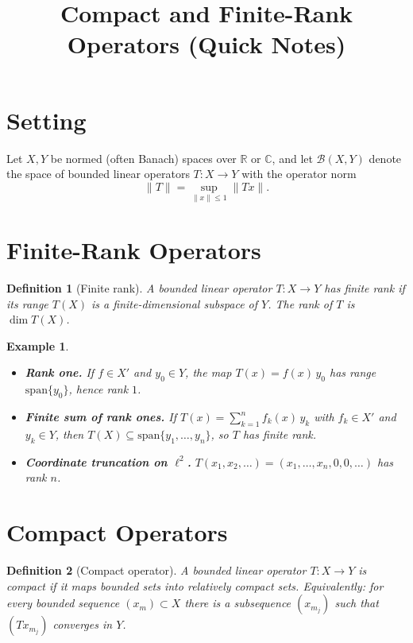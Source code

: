 \documentclass[11pt]{article}
\title{Compact and Finite-Rank Operators (Quick Notes)}
\author{}
\date{}
\newtheorem{definition}{Definition}
\newtheorem{example}{Example}
\newcommand{\RR}{\mathbb{R}}
\newcommand{\CC}{\mathbb{C}}
\begin{document}
\maketitle

\section*{Setting}
Let $X,Y$ be normed (often Banach) spaces over $\RR$ or $\CC$, and let $\mathcal{B}(X,Y)$ denote the space of bounded linear operators $T:X\to Y$ with the operator norm
\[
\|T\|=\sup_{\|x\|\le 1}\|Tx\|.
\]

\section{Finite-Rank Operators}
\begin{definition}[Finite rank]
A bounded linear operator $T:X\to Y$ has \emph{finite rank} if its range $T(X)$ is a finite-dimensional subspace of $Y$. The \emph{rank} of $T$ is $\dim T(X)$.
\end{definition}

\begin{example}
\leavevmode
\begin{itemize}
  \item \textbf{Rank one.} If $f\in X'$ and $y_0\in Y$, the map $T(x)=f(x)\,y_0$ has range $\mathrm{span}\{y_0\}$, hence rank $1$.
  \item \textbf{Finite sum of rank ones.} If $T(x)=\sum_{k=1}^n f_k(x)\,y_k$ with $f_k\in X'$ and $y_k\in Y$, then $T(X)\subseteq \mathrm{span}\{y_1,\dots,y_n\}$, so $T$ has finite rank.
  \item \textbf{Coordinate truncation on $\ell^2$.} $T(x_1,x_2,\dots)=(x_1,\dots,x_n,0,0,\dots)$ has rank $n$.
\end{itemize}
\end{example}

\section{Compact Operators}
\begin{definition}[Compact operator]
A bounded linear operator $T:X\to Y$ is \emph{compact} if it maps bounded sets into relatively compact sets. Equivalently: for every bounded sequence $(x_m)\subset X$ there is a subsequence $(x_{m_j})$ such that $(Tx_{m_j})$ converges in $Y$.
\end{definition}
\end{document}
